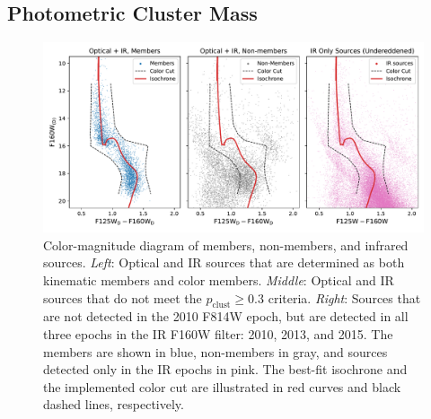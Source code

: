 \documentclass[12pt]{ucsddissertation}
\newcommand{\pclust}{p_{\mathrm{clust}}}
\begin{document}
\begin{CJK*}{UTF8}{gbsn}
\subsection{Photometric Cluster Mass}
\begin{figure}[htb!]
    \centering
    \includegraphics[width=\linewidth]{figures/chapter3/CMD_members_nonmembers.pdf}
    \caption[Color-magnitude diagram of members, non-members, and infrared sources]{Color-magnitude diagram of members, non-members, and infrared sources. \textit{Left}: Optical and IR sources that are determined as both kinematic members and color members. \textit{Middle}: Optical and IR sources that do not meet the $\pclust \geq 0.3$ criteria. \textit{Right}: Sources that are not detected in the 2010 F814W epoch, but are detected in all three epochs in the IR F160W filter: 2010, 2013, and 2015. The members are shown in blue, non-members in gray, and sources detected only in the IR epochs in pink. The best-fit isochrone and the implemented color cut are illustrated in red curves and black dashed lines, respectively.}
    \label{fig:cmd_members_nonmembers}
\end{figure}


\end{CJK*}
\end{document}
